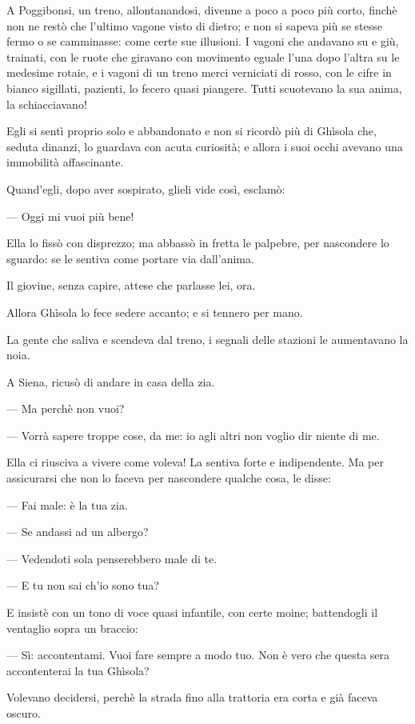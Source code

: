 A Poggibonsi, un treno, allontanandosi, divenne a poco a poco più corto, finchè non ne restò che l’ultimo vagone visto di dietro; e non si sapeva più se stesse fermo o se camminasse: come certe sue illusioni. I vagoni che andavano su e giù, trainati, con le ruote che giravano con movimento eguale l’una dopo l’altra su le medesime rotaie, e i vagoni di un treno merci verniciati di rosso, con le cifre in bianco sigillati, pazienti, lo fecero quasi piangere. Tutti scuotevano la sua anima, la schiacciavano!

Egli si sentì proprio solo e abbandonato e non si ricordò più di Ghìsola che, seduta dinanzi, lo guardava con acuta curiosità; e allora i suoi occhi avevano una immobilità affascinante.

Quand’egli, dopo aver sospirato, glieli vide così, esclamò:

— Oggi mi vuoi più bene!

Ella lo fissò con disprezzo; ma abbassò in fretta le palpebre, per nascondere lo sguardo: se le sentiva come portare via dall’anima.

Il giovine, senza capire, attese che parlasse lei, ora.

Allora Ghìsola lo fece sedere accanto; e si tennero per mano.

La gente che saliva e scendeva dal treno, i segnali delle stazioni le aumentavano la noia.

A Siena, ricusò di andare in casa della zia.

— Ma perchè non vuoi?

— Vorrà sapere troppe cose, da me: io agli altri non voglio dir niente di me.

Ella ci riusciva a vivere come voleva! La sentiva forte e indipendente. Ma per assicurarsi che non lo faceva per nascondere qualche cosa, le disse:

— Fai male: è la tua zia.

— Se andassi ad un albergo?

— Vedendoti sola penserebbero male di te.

— E tu non sai ch’io sono tua?

E insistè con un tono di voce quasi infantile, con certe moine; battendogli il ventaglio sopra un braccio:

— Sì: accontentami. Vuoi fare sempre a modo tuo. Non è vero che questa sera accontenterai la tua Ghìsola?

Volevano decidersi, perchè la strada fino alla trattoria era corta e già faceva oscuro.

